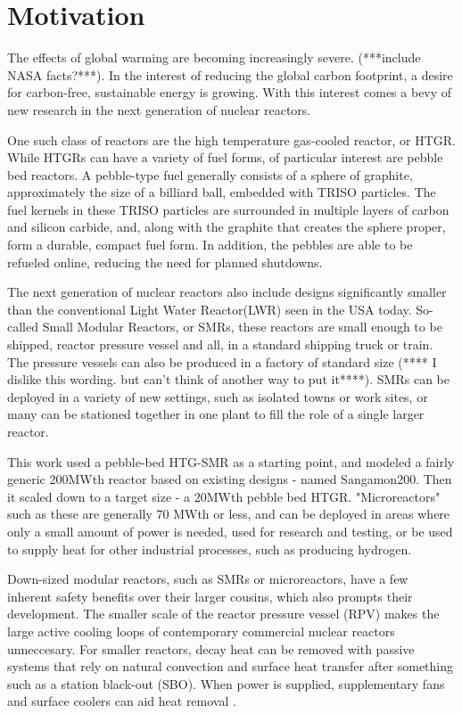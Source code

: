 \section{Motivation}

The effects of global warming are becoming increasingly severe. (***include NASA facts?***).  In the interest of reducing the global carbon footprint, a desire for carbon-free, sustainable energy is growing. With this interest comes a bevy of new research in the next generation of nuclear reactors.

One such class of reactors are the high temperature gas-cooled reactor, or HTGR.  While HTGRs can have a variety of fuel forms, of particular interest are pebble bed reactors.  A pebble-type fuel generally consists of a sphere of graphite, approximately the size of a billiard ball, embedded with TRISO particles.  The fuel kernels in these TRISO particles are surrounded in multiple layers of carbon and silicon carbide, and, along with the graphite that creates the sphere proper, form a durable, compact fuel form.  In addition, the pebbles are able to be refueled online, reducing the need for planned shutdowns.

The next generation of nuclear reactors also include designs significantly smaller than the conventional Light Water Reactor(LWR) seen in the USA today.  So-called Small Modular Reactors, or SMRs, these reactors are small enough to be shipped, reactor pressure vessel and all, in a standard shipping truck or train.  The pressure vessels can also be produced in a factory of standard size (**** I dislike this wording. but can't think of another way to put it****).  SMRs can be deployed in a variety of new settings, such as isolated towns or work sites, or many can be stationed together in one plant to fill the role of a single larger reactor.

This work used a pebble-bed HTG-SMR as a starting point, and modeled a fairly generic 200MWth reactor based on existing designs - named Sangamon200. Then it scaled down to a target size - a 20MWth pebble bed HTGR.  "Microreactors" such as these are generally 70 MWth or less, and can be deployed in areas where only a small amount of power is needed, used for research and testing, or be used to supply heat for other industrial processes, such as producing hydrogen.

Down-sized modular reactors, such as SMRs or microreactors, have a few inherent safety benefits over their larger cousins, which also prompts their development.  The smaller scale of the reactor pressure vessel (RPV) makes the large active cooling loops of contemporary commercial nuclear reactors unneccesary.  For smaller reactors, decay heat can be removed with passive systems that rely on natural convection and surface heat transfer after something such as a station black-out (SBO).  When power is supplied, supplementary fans and surface coolers can aid heat removal \cite{reutler_advantages_1984}.

